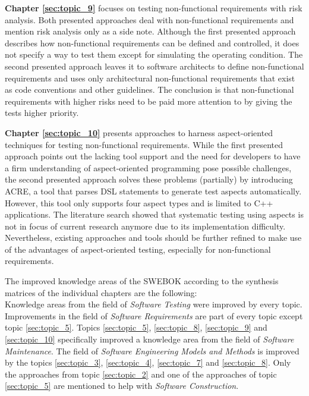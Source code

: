 \textbf{Chapter \ref{sec:topic_9}} focuses on testing non-functional requirements with risk analysis. Both presented approaches deal with non-functional requirements and mention risk analysis only as a side note. Although the first presented approach \cite{ZouPavlovski2008} describes how non-functional requirements can be defined and controlled, it does not specify a way to test them except for simulating the operating condition. The second presented approach \cite{Lagerstedt2014} leaves it to software architects to define non-functional requirements and uses only architectural non-functional requirements that exist as code conventions and other guidelines. The conclusion is that non-functional requirements with higher risks need to be paid more attention to by giving the tests higher priority.

\textbf{Chapter \ref{sec:topic_10}} presents approaches to harness aspect-oriented techniques for testing non-functional requirements. While the first presented approach \cite{Metsa} points out the lacking tool support and the need for developers to have a firm understanding of aspect-oriented programming pose possible challenges, the second presented approach \cite{Duclos} solves these problems (partially) by introducing ACRE, a tool that parses DSL statements to generate test aspects automatically. However, this tool only supports four aspect types and is limited to C++ applications. The literature search showed that systematic testing using aspects is not in focus of current research anymore due to its implementation difficulty. Nevertheless, existing approaches and tools should be further refined to make use of the advantages of aspect-oriented testing, especially for non-functional requirements. 


The improved knowledge areas of the SWEBOK according to the synthesis matrices of the individual chapters are the following:\\
Knowledge areas from the field of \textit{Software Testing} were improved by every topic. Improvements in the field of \textit{Software Requirements} are part of every topic except topic \ref{sec:topic_5}. Topics \ref{sec:topic_5}, \ref{sec:topic_8}, \ref{sec:topic_9} and \ref{sec:topic_10} specifically improved a knowledge area from the field of \textit{Software Maintenance}. The field of \textit{Software Engineering Models and Methods} is improved by the topics \ref{sec:topic_3}, \ref{sec:topic_4}, \ref{sec:topic_7} and \ref{sec:topic_8}. Only the approaches from topic \ref{sec:topic_2} and one of the approaches of topic \ref{sec:topic_5} are mentioned to help with \textit{Software Construction}.

